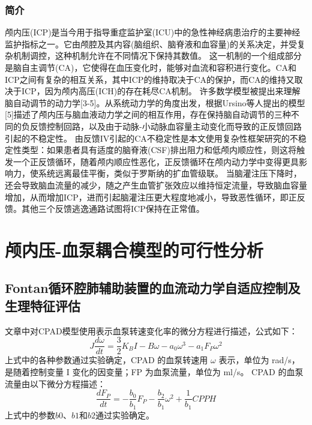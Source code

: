 \documentclass[titlepage,12pt]{article}
\begin{document}
\subsubsection{简介}
颅内压(ICP)是当今用于指导重症监护室(ICU)中的急性神经病患治疗的主要神经监护指标之一。它由颅腔及其内容(脑组织、脑脊液和血容量)的关系决定，并受复杂机制调控，这种机制允许在不同情况下保持其数值。
这一机制的一个组成部分是脑自主调节(CA)，它使得在血压变化时，能够对血流和容积进行变化。CA和ICP之间有复杂的相互关系，其中ICP的维持取决于CA的保护，而CA的维持又取决于ICP，因为颅内高压(ICH)的存在耗尽CA机制。
许多数学模型被提出来理解脑自动调节的动力学[3-5]。从系统动力学的角度出发，根据Ursino等人提出的模型[5]描述了颅内压与脑血液动力学之间的相互作用，存在保持脑自动调节的三种不同的负反馈控制回路，以及由于动脉-小动脉血容量主动变化而导致的正反馈回路引起的不稳定性。
由反馈IV引起的CA不稳定性是本文使用复杂性框架研究的不稳定性类型：如果患者具有适度的脑脊液(CSF)排出阻力和低颅内顺应性，则这将触发一个正反馈循环，随着颅内顺应性恶化，正反馈循环在颅内动力学中变得更具影响力，使系统远离最佳平衡，类似于罗斯纳的扩血管级联。
当脑灌注压下降时，还会导致脑血流量的减少，随之产生血管扩张效应以维持恒定流量，导致脑血容量增加，从而增加ICP，进而引起脑灌注压更大程度地减小，导致恶性循环，即正反馈。其他三个反馈逃逸通路试图将ICP保持在正常值。

\section{颅内压-血泵耦合模型的可行性分析}
\subsection{Fontan循环腔肺辅助装置的血流动力学自适应控制及生理特征评估}
文章中对CPAD模型使用表示血泵转速变化率的微分方程进行描述，公式如下：
\begin{equation*}
    J \frac{d\omega}{dt} = \frac{3}{2} K_B I - B \omega - a_0 \omega^3 - a_1 F_P \omega^2
\end{equation*}
上式中的各种参数通过实验确定，CPAD 的血泵转速用 $\omega$ 表示，单位为 rad/s，是随着控制变量 I 变化的因变量；FP 为血泵流量，单位为 ml/s。
CPAD 的血泵流量由以下微分方程描述：
\begin{equation*}
    \frac{dF_P}{dt} = -\frac{b_0}{b_1} F_P - \frac{b_2}{b_1} \omega^2 + \frac{1}{b_1} CPPH
\end{equation*}
上式中的参数$b0$、$b1$和$b2$通过实验确定。
\end{document}
